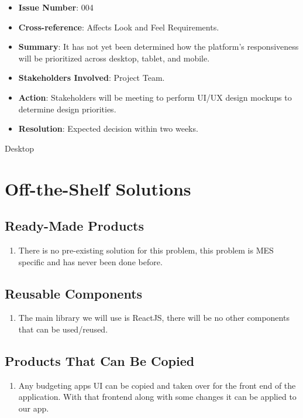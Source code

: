 \documentclass[12pt]{article}
\begin{document}
\begin{itemize}
  \bigskip

  \item \textbf{Issue Number}: 004
  \item \textbf{Cross-reference}: Affects Look and Feel Requirements.
  \item \textbf{Summary}: It has not yet been determined how the platform's responsiveness will be prioritized across desktop, tablet, and mobile.
  \item \textbf{Stakeholders Involved}: Project Team.
  \item \textbf{Action}: Stakeholders will be meeting to perform UI/UX design mockups to determine design priorities.
  \item \textbf{Resolution}: Expected decision within two weeks.
\end{itemize}

Desktop

\section{Off-the-Shelf Solutions}
\subsection{Ready-Made Products}
\begin{enumerate}
  \item There is no pre-existing solution for this problem, this problem is MES specific and has never been done before.
\end{enumerate}
\subsection{Reusable Components}
\begin{enumerate}
  \item The main library we will use is ReactJS, there will be no other components that can be used/reused. 
\end{enumerate}
\subsection{Products That Can Be Copied}
\begin{enumerate}
  \item Any budgeting apps UI can be copied and taken over for the front end of the application. With that frontend along with some changes it can be applied to our app. 
\end{enumerate}
\end{document}

